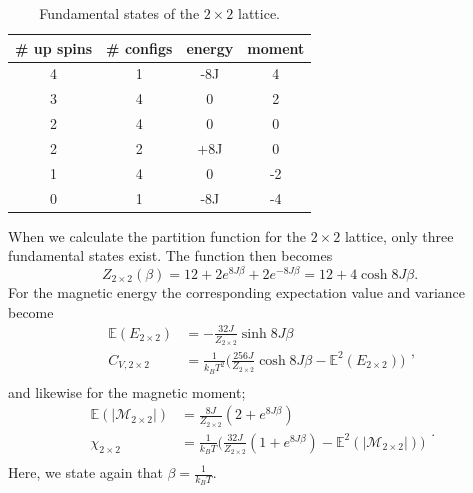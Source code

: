 \documentclass[]{article}
\begin{document}
\begin{table}[!h]
	\caption{Fundamental states of the $2 \times 2$ lattice.}
	\label{tab:2x2-states}
	\begin{center}
		\begin{tabular}{c|c|c|c}
			\toprule
			\# up spins 		& \# configs		& energy	& moment	\\
			\midrule
			4				& 1				& -8J		& 4			\\
			3				& 4				&  0		& 2			\\
			2				& 4				&  0		& 0			\\
			2				& 2				& +8J		& 0			\\
			1				& 4				&  0		& -2		\\
			0				& 1				& -8J		& -4		\\
			\bottomrule
		\end{tabular}
	\end{center}
\end{table}

When we calculate the partition function for the $2 \times 2$ lattice, only three fundamental states exist. The function then becomes
\begin{equation}
	Z_{2 \times 2} (\beta) = 12 + 2e^{8J \beta} + 2e^{-8J \beta} = 12 + 4\cosh 8J\beta.
\end{equation}
For the magnetic energy the corresponding expectation value and variance become
\begin{equation} \label{eq:energy-analytical}
\begin{aligned}
	\mathbb{E}(E_{2 \times 2}) &= -\frac{32J}{Z_{2 \times 2}} \sinh 8J\beta \\
	C_{V, 2 \times 2} &= \frac{1}{k_B T^2} \bigg( \frac{256J}{Z_{2 \times 2}} \cosh 8J\beta - \mathbb{E}^2(E_{2 \times 2}) \bigg) \\
\end{aligned},
\end{equation} \label{eq:moment-analytical}
and likewise for the magnetic moment; 
\begin{equation}
\begin{aligned}
	\mathbb{E}(|\mathcal{M}_{2 \times 2}|) &= \frac{8J}{Z_{2 \times 2}} (2 + e^{8J\beta}) \\
	\chi_{2 \times 2} &= \frac{1}{k_B T} \bigg( \frac{32J}{Z_{2 \times 2}} (1 + e^{8J\beta}) - \mathbb{E}^2(|\mathcal{M}_{2 \times 2}|) \bigg) \\
\end{aligned}.
\end{equation}
Here, we state again that $\beta = \frac{1}{k_B T}$.
\end{document}
